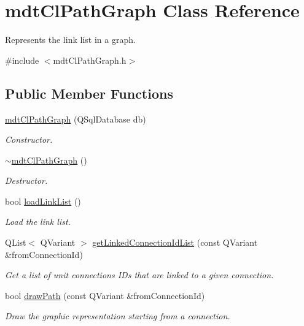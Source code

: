 \hypertarget{classmdt_cl_path_graph}{\section{mdt\-Cl\-Path\-Graph Class Reference}
\label{classmdt_cl_path_graph}
}


Represents the link list in a graph.  




{\ttfamily \#include $<$mdt\-Cl\-Path\-Graph.\-h$>$}

\subsection*{Public Member Functions}
\begin{DoxyCompactItemize}
\item 
\hyperlink{classmdt_cl_path_graph_a3d2b4b4b0f32dc166e59e3c5384492e9}{mdt\-Cl\-Path\-Graph} (Q\-Sql\-Database db)
\begin{DoxyCompactList}\small\item\em Constructor. \end{DoxyCompactList}\item 
\hyperlink{classmdt_cl_path_graph_aa72798f4edc19fc69d32cd5d7d643bb8}{$\sim$mdt\-Cl\-Path\-Graph} ()
\begin{DoxyCompactList}\small\item\em Destructor. \end{DoxyCompactList}\item 
bool \hyperlink{classmdt_cl_path_graph_a40e80f68b2600ad69a1fe74aa40393f8}{load\-Link\-List} ()
\begin{DoxyCompactList}\small\item\em Load the link list. \end{DoxyCompactList}\item 
Q\-List$<$ Q\-Variant $>$ \hyperlink{classmdt_cl_path_graph_a09b3b342fe09d1afdbc88c8c683ab016}{get\-Linked\-Connection\-Id\-List} (const Q\-Variant \&from\-Connection\-Id)
\begin{DoxyCompactList}\small\item\em Get a list of unit connections I\-Ds that are linked to a given connection. \end{DoxyCompactList}\item 
bool \hyperlink{classmdt_cl_path_graph_ae779d0527cc984122dbf063238b59749}{draw\-Path} (const Q\-Variant \&from\-Connection\-Id)
\begin{DoxyCompactList}\small\item\em Draw the graphic representation starting from a connection. \end{DoxyCompactList}\item 

\end{DoxyCompactItemize}
